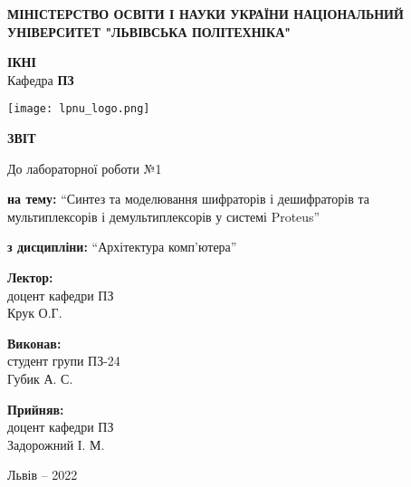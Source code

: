 \documentclass[12pt]{extarticle}
\begin{document}
\begin{titlepage}
    \begin{center}
        \textbf{\normalsize{\MakeUppercase{
            Міністерство Освіти і науки України
            Національний університет "Львівська політехніка"
        }}}

        \begin{flushright}
        \textbf{ІКНІ}\\
        Кафедра \textbf{ПЗ}
        \end{flushright}
        \vspace{15mm}

        \texttt{[image: lpnu\_logo.png]}

        \vspace*{\fill}

        \textbf{\normalsize{\MakeUppercase{Звіт}}}
            
        До лабораторної роботи №1

        \textbf{на тему:} “Синтез та моделювання 
        шифраторів і дешифраторів та 
        мультиплексорів і демультиплексорів у системі Proteus”

        \textbf{з дисципліни:} “Архітектура комп’ютера”
            
        \vspace*{\fill}

        \begin{flushright}

            \textbf{Лектор:}\\
            доцент кафедри ПЗ\\
            Крук О.Г.\\
            \vspace{12pt}

            \textbf{Виконав:}\\
            студент групи ПЗ-24\\
            Губик А. С.\\
            \vspace{12pt}

            \textbf{Прийняв:}\\
            доцент кафедри ПЗ\\
            Задорожний І. М.\\
        \vspace{12pt}
        \end{flushright}

        Львів -- 2022
            
            
    \end{center}
\end{titlepage}
\end{document}

